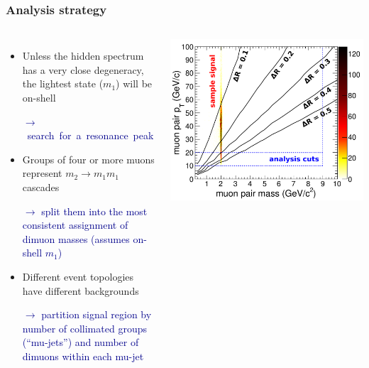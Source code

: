 \documentclass[compress]{beamer}
\begin{document}
\begin{frame}
\frametitle{Analysis strategy}
\begin{columns}
\begin{itemize}
\item Unless the hidden spectrum has a very close degeneracy, the
  lightest state ($m_1$) will be on-shell

  \textcolor{darkblue}{\mbox{$\longrightarrow$ search for a resonance peak}}  %

\item Groups of four or more muons represent $m_2 \to m_1 m_1$ cascades

  \textcolor{darkblue}{$\longrightarrow$ split them into the
      most consistent assignment of dimuon masses (assumes on-shell $m_1$)}

\item Different event topologies have different backgrounds

  \textcolor{darkblue}{$\longrightarrow$ partition signal region by
    number of collimated groups (``mu-jets'') and number of dimuons within each mu-jet}
\end{itemize}

\vspace{0.1 cm}
\includegraphics[width=\linewidth]{openingangle_with_signal.pdf}


\end{columns}
\end{frame}
\end{document}
